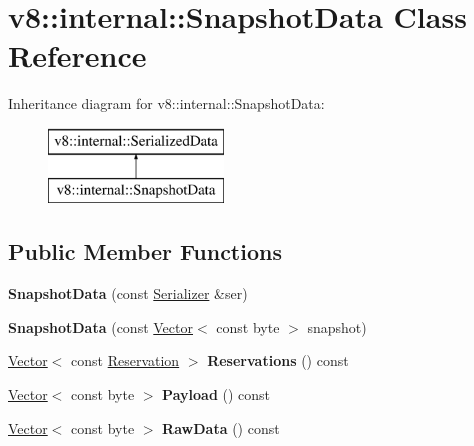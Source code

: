 \hypertarget{classv8_1_1internal_1_1_snapshot_data}{}\section{v8\+:\+:internal\+:\+:Snapshot\+Data Class Reference}
\label{classv8_1_1internal_1_1_snapshot_data}
Inheritance diagram for v8\+:\+:internal\+:\+:Snapshot\+Data\+:\begin{figure}[H]
\begin{center}
\leavevmode
\includegraphics[height=2.000000cm]{classv8_1_1internal_1_1_snapshot_data}
\end{center}
\end{figure}
\subsection*{Public Member Functions}
\begin{DoxyCompactItemize}
\item 
{\bfseries Snapshot\+Data} (const \hyperlink{classv8_1_1internal_1_1_serializer}{Serializer} \&ser)\hypertarget{classv8_1_1internal_1_1_snapshot_data_ad89e8a4b038ccec75605a3113cf57243}{}\label{classv8_1_1internal_1_1_snapshot_data_ad89e8a4b038ccec75605a3113cf57243}

\item 
{\bfseries Snapshot\+Data} (const \hyperlink{classv8_1_1internal_1_1_vector}{Vector}$<$ const byte $>$ snapshot)\hypertarget{classv8_1_1internal_1_1_snapshot_data_a248fcacda06cb9107fa8a4bd762fa400}{}\label{classv8_1_1internal_1_1_snapshot_data_a248fcacda06cb9107fa8a4bd762fa400}

\item 
\hyperlink{classv8_1_1internal_1_1_vector}{Vector}$<$ const \hyperlink{classv8_1_1internal_1_1_serialized_data_1_1_reservation}{Reservation} $>$ {\bfseries Reservations} () const \hypertarget{classv8_1_1internal_1_1_snapshot_data_a37a31cd5f4bc65b25e3e5946bdfc3285}{}\label{classv8_1_1internal_1_1_snapshot_data_a37a31cd5f4bc65b25e3e5946bdfc3285}

\item 
\hyperlink{classv8_1_1internal_1_1_vector}{Vector}$<$ const byte $>$ {\bfseries Payload} () const \hypertarget{classv8_1_1internal_1_1_snapshot_data_ad1e8d1f64f1a6b91f7c55439d3b037d7}{}\label{classv8_1_1internal_1_1_snapshot_data_ad1e8d1f64f1a6b91f7c55439d3b037d7}

\item 
\hyperlink{classv8_1_1internal_1_1_vector}{Vector}$<$ const byte $>$ {\bfseries Raw\+Data} () const \hypertarget{classv8_1_1internal_1_1_snapshot_data_a3043007a8b04c27e7586fdf548733086}{}\label{classv8_1_1internal_1_1_snapshot_data_a3043007a8b04c27e7586fdf548733086}

\end{DoxyCompactItemize}
